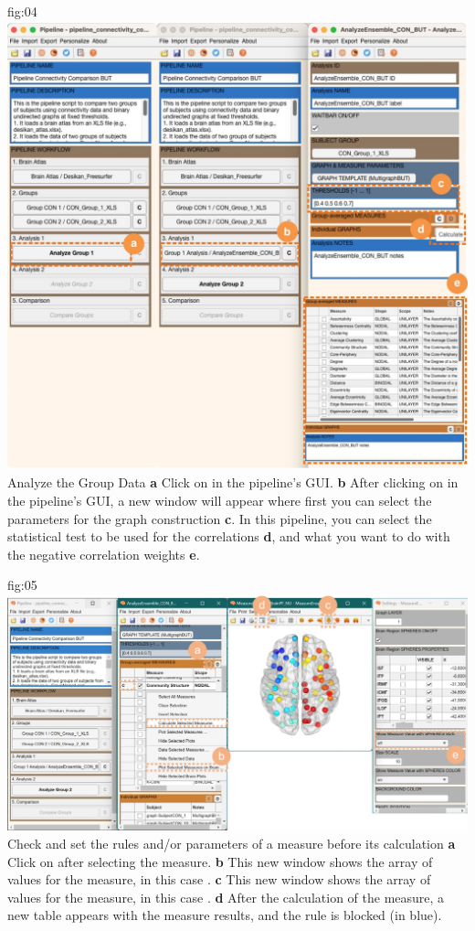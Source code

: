 \documentclass[justified]{tufte-handout}
\begin{document}
	{fig:04}
	{
	\includegraphics{fig04.jpg}
	}
	{Analyze the Group Data}
	{
	{\bf a} Click on  in the pipeline's GUI.
        {\bf b} After clicking on  in the pipeline's GUI, a new window will appear where first you can select the parameters for the graph construction {\bf c}. In this pipeline, you can select the statistical test to be used for the correlations {\bf d}, and what you want to do with the negative correlation weights {\bf e}.
	}

	{fig:05}
	{
	\includegraphics{fig05.jpg}
	}
	{Check and set the rules and/or parameters of a measure before its calculation}
	{
	{\bf a} Click on  after selecting the measure.
	{\bf b} This new window shows the array of values for the measure, in this case .
 	{\bf c} This new window shows the array of values for the measure, in this case .
  	{\bf d} After the calculation of the measure, a new table appears with the measure results, and the rule is blocked (in blue).
	}
 
\end{document}
